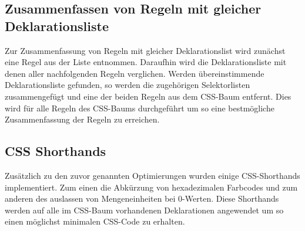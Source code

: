 \subsection{Zusammenfassen von Regeln mit gleicher Deklarationsliste}
Zur Zusammenfassung von Regeln mit gleicher Deklarationslist wird zunächst eine Regel aus der Liste entnommen. Daraufhin wird die Deklarationsliste mit denen aller nachfolgenden Regeln verglichen. Werden übereinstimmende Deklarationsliste gefunden, so werden die zugehörigen Selektorlisten zusammengefügt und eine der beiden Regeln aus dem CSS-Baum entfernt.
Dies wird für alle Regeln des CSS-Baums durchgeführt um so eine bestmögliche Zusammenfassung der Regeln zu erreichen.

\subsection{CSS Shorthands}
Zusätzlich zu den zuvor genannten Optimierungen wurden einige CSS-Shorthands implementiert. Zum einen die Abkürzung von hexadezimalen Farbcodes und zum anderen des auslassen von Mengeneinheiten bei 0-Werten.
Diese Shorthands werden auf alle im CSS-Baum vorhandenen Deklarationen angewendet um so einen möglichst minimalen CSS-Code zu erhalten.

